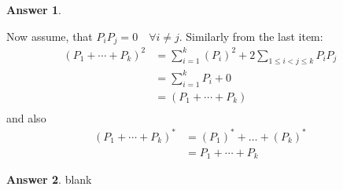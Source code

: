 \documentclass[12pt]{article}
\theoremstyle{plain}
\theoremstyle{definition}
\newtheorem{ans}{Answer}
\begin{document}
\begin{ans}
\begin{enumerate}[(a)]
			Now assume, that $ P_iP_j = 0 \quad \forall i \neq j$. Similarly from the last item:
			\begin{align*}
				(P_1 + \cdots + P_k)^2 &= \sum_{i=1}^{k} (P_i)^2 + 2\sum_{1 \leq i < j \leq k}P_iP_j&\\
				&= \sum_{i=1}^{k} P_i  + 0&\\
				&= (P_1 + \cdots + P_k)&\\
			\end{align*}
			and also
			\begin{align*}
				(P_1 + \cdots + P_k)^{*} &= (P_1)^{*} + \dots + (P_k)^{*}&\\
				&= P_1 + \cdots + P_k
			\end{align*}
	\end{enumerate}
\end{ans}

\noindent \hrulefill

\begin{ans}
	blank
\end{ans}
\end{document}
